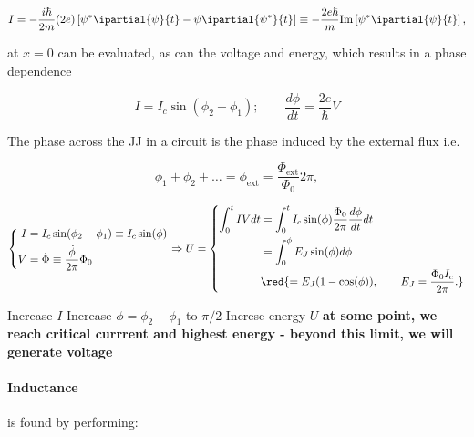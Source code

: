    
   \begin{equation}
	   I = -\frac{i\hbar}{2m}(2e)\left[\psi^*\ipartial{\psi}{t}-\psi\ipartial{\psi^*}{t}\right] \equiv -\frac{2e\hbar}{m}\text{Im}\left[\psi^*\ipartial{\psi}{t}\right],
   \end{equation}
   
   \noindent at $x=0$ can be evaluated, as can the voltage and energy, which results in a phase dependence
   
   \begin{equation}
   \label{l2-dcac}
   I = I_c\sin(\phi_2-\phi_1); \qquad \frac{d\phi}{dt} = \frac{2e}{\hbar}V
   \end{equation}
   
   The phase across the JJ in a circuit is the phase induced by the external flux i.e.
   
   \begin{equation}
   \label{eqn:l2-phasesum}
   \phi_1+\phi_2+\ldots = \phi_\text{ext} = \frac{\Phi_\text{ext}}{\Phi_0}2\pi,
   \end{equation}
   
   \begin{equation}
	   \left\lbrace\begin{aligned}
		   I &= I_c\sin(\phi_2-\phi_1)\equiv I_c\sin(\phi)\\
		   V&=\dot{\Phi} \equiv \frac{\dot{\phi}}{2\pi}\Phi_0
	   \end{aligned}\right. \Rightarrow U = \left\lbrace\begin{aligned}
		   \int_{0}^{t}IV dt & = \int_{0}^{t}I_c\sin(\phi)\frac{\Phi_0}{2\pi}\frac{d\phi}{dt}dt\\
		   & = \int_{0}^{\phi} E_J\sin(\phi)d\phi\\
		   & \red{= E_J(1-\cos(\phi)),\qquad E_J = \frac{\Phi_0I_c}{2\pi}.}
	   \end{aligned}\right.
	   \label{l2-JJEnergy}
   \end{equation} 
   
  \begin{center}
  	Increase $ I $ \ra Increase $ \phi = \phi_2-\phi_1 $ to $ \pi/2 $ \ra Increse energy $ U $ \ra \textbf{at some point, we reach critical currrent and highest energy - beyond this limit, we will generate voltage}
  \end{center}
   
  \paragraph{Inductance} is found by performing:
  
